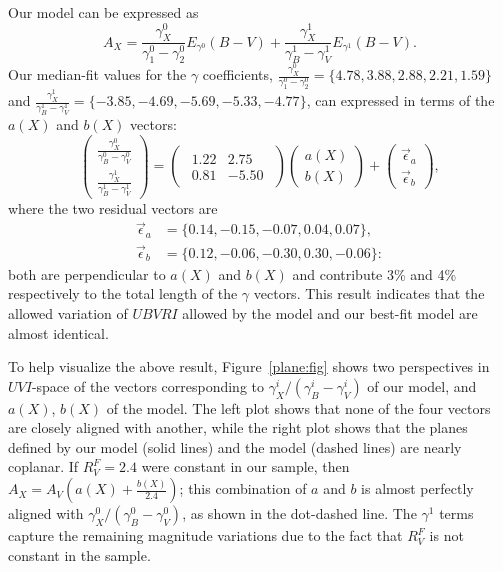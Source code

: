 \documentclass{aastex61}   	%
\begin{document}
Our model can be expressed as
\begin{equation}
A_X = \frac{\gamma^0_X}{\gamma^0_1-\gamma^0_2}  E_{\gamma^0}(B-V) +  \frac{\gamma^1_X}{\gamma^1_B-\gamma^1_V}  E_{\gamma^1}(B-V).
\end{equation}
\color{red}
Our median-fit values for the $\gamma$ coefficients,
$\frac{\gamma^0_X}{\gamma^0_1-\gamma^0_2}  =\{4.78,   3.88,   2.88,   2.21,   1.59\}$ and
$ \frac{\gamma^1_X}{\gamma^1_B-\gamma^1_V}=\{-3.85,   -4.69,   -5.69,  -5.33,  -4.77\}$,
\color{black}
can expressed in terms of the $a(X)$ and $b(X)$ vectors:
\begin{equation}
\begin{pmatrix}
 \frac{\gamma^0_X}{\gamma^0_B-\gamma^0_V} \\
\frac{\gamma^1_X}{\gamma^1_B-\gamma^1_V} 
\end{pmatrix}=
\begin{pmatrix}
\begin{array}{rr}
1.22 & 2.75 \\
0.81 & -5.50
\end{array}
\end{pmatrix} 
\begin{pmatrix}
a(X) \\
b(X)
\end{pmatrix}+
\begin{pmatrix}
\vec{\epsilon}_a \\
\vec{\epsilon}_b
\end{pmatrix},
\end{equation}
where the two residual vectors are
\color{red}
\begin{align}
\vec{\epsilon}_a &=\{0.14, -0.15, -0.07,  0.04, 0.07\}, \\
\vec{\epsilon}_b & =\{0.12, -0.06, -0.30, 0.30, -0.06\}:
\end{align}
\color{black}
both are perpendicular to $a(X)$ and $b(X)$ and
contribute  3\% and 4\% respectively to the total  length of the $\gamma$ vectors.
This result indicates that
the allowed variation of $UBVRI$ allowed by the  model and our best-fit model are almost identical.

\color{red}
To help visualize the above result, Figure~\ref{plane:fig} shows two perspectives in $UVI$-space
of the vectors corresponding to $\gamma^i_X/(\gamma^i_B-\gamma^i_V)$ of our model,
and $a(X)$, $b(X)$ of the  model.
The left plot shows that none of the four vectors are closely aligned with another, while the right plot shows that
the planes defined by our model (solid lines) and the   model (dashed lines) are nearly coplanar.
If $R^F_V=2.4$ were constant in our sample, then $A_X = A_V\left(a(X) + \frac{b(X)}{2.4}\right)$;  this combination of $a$ and $b$ is
almost perfectly aligned with $\gamma^0_X/(\gamma^0_B-\gamma^0_V)$, as shown in the dot-dashed line.  
The $\gamma^1$ terms capture the remaining magnitude variations due to the fact that $R^F_V$ is not constant in the sample.
\end{document}
